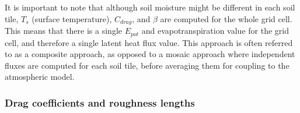 It is important to note that although soil moisture might be different in each soil tile, $T_s$ (surface temperature), $C_{drag}$, and $\beta$ are computed for the whole grid cell. This means that there is a single $E_{pot}$ and evapotranspiration value for the grid cell, and therefore a single latent heat flux value.
This approach is often referred to as a composite approach, as opposed to a mosaic approach where independent fluxes are computed for each soil tile, before averaging them for coupling to the atmospheric model. 




\hfill

\subsubsection*{Drag coefficients and roughness lengths}

